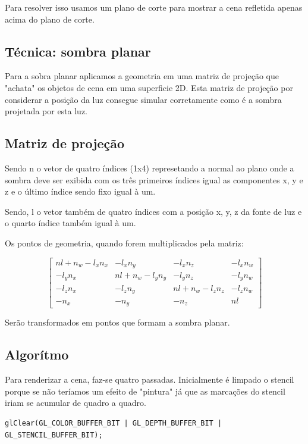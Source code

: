 \documentclass[11pt, a4paper]{article}
\begin{document}
Para resolver isso usamos um plano de corte para mostrar a cena refletida apenas
acima do plano de corte.


\subsection {Técnica: sombra planar}

Para a sobra planar aplicamos a geometria em uma matriz de projeção que "achata"
os objetos de cena em uma superficie 2D. Esta matriz de projeção por considerar a posição da luz
consegue simular corretamente como é a sombra projetada por esta luz.

\subsection{Matriz de projeção}

Sendo n o vetor de quatro índices (1x4) represetando a normal ao plano onde a sombra deve
ser exibida com os três primeiros índices igual as componentes x, y e z e o último
índice sendo fixo igual à um.

Sendo, l o vetor também de quatro índices com a posição x, y, z da fonte de luz 
e o quarto índice também igual à um.

Os pontos de geometria, quando forem multiplicados pela matriz:

\[
\begin{bmatrix}
  nl + n_{w} - l_{x}n_{x} & -l_{x}n_{y} & -l_{x}n_{z} & -l_{x}n_{w} \\
  -l_{y}n_{x} & nl + n_{w} - l_{y}n_{y} & -l_{y}n_{z} & -l_{y}n_{w} \\
  -l_{z}n_{x} & -l_{z}n_{y} & nl + n_{w} - l_{z}n_{z} & -l_{z}n_{w} \\
  -n_{x} & -n_{y} & -n_{z} & nl
\end{bmatrix}
\]

Serão transformados em pontos que formam a sombra planar.

\subsection{Algorítmo}
Para renderizar a cena, faz-se quatro passadas. Inicialmente é limpado o stencil 
porque se não teríamos um efeito de "pintura" já que as marcações do stencil 
iriam se acumular de quadro a quadro.

\begin{verbatim}
glClear(GL_COLOR_BUFFER_BIT | GL_DEPTH_BUFFER_BIT | GL_STENCIL_BUFFER_BIT);
\end{verbatim}
\end{document}
